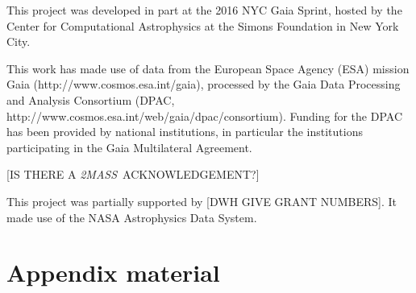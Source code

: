\documentclass[12pt, preprint]{aastex6}
\newcommand{\acronym}[1]{{\small{#1}}}
\newcommand{\project}[1]{\textsl{#1}}
\newcommand{\tmass}{\project{\acronym{2MASS}}}
\begin{document}
This project was developed in part at the 2016 \acronym{NYC} Gaia Sprint, hosted
by the Center for Computational Astrophysics at the Simons Foundation
in New York City.

This work has made use of data from the European Space Agency (\acronym{ESA})
mission Gaia (http://www.cosmos.esa.int/gaia), processed by the Gaia
Data Processing and Analysis Consortium (\acronym{DPAC},
http://www.cosmos.esa.int/web/gaia/dpac/consortium). Funding for the
\acronym{DPAC} has been provided by national institutions, in particular the
institutions participating in the Gaia Multilateral Agreement.

[IS THERE A \tmass\ ACKNOWLEDGEMENT?]

This project was partially supported by [DWH GIVE GRANT NUMBERS]. It
made use of the \acronym{NASA} Astrophysics Data System.

\appendix

\section{Appendix material}



\clearpage
\end{document}
